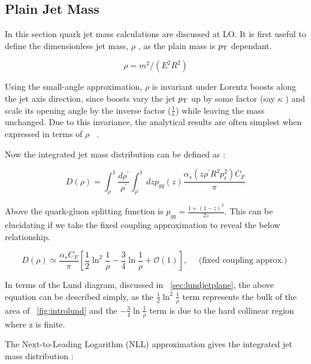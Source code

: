 \subsection{Plain Jet Mass }\label{sec:jetmass}


In this section quark jet mass calculations are discussed at LO. It is first useful to define the dimensionless jet mass, $\rho$ , as the plain mass is $p_{\mathrm{T}}$ dependant.


\begin{equation}
\rho=m^{2} /\left(E^{2} R^{2}\right)
\end{equation}



Using the small-angle approximation, $\rho$ is invariant under Lorentz boosts along the jet axis direction, since boosts vary the jet $p_{\mathrm{T}}$ up by some factor (say $\kappa$ ) and scale its opening angle by the inverse factor ($\frac{1}{\kappa}$) while leaving the mass unchanged. Due to this invariance, the analytical results are often simplest when expressed in terms of $\rho$ ~\cite{mmdt}.

Now the integrated jet mass distribution can be defined as :\newline

\begin{equation}
D(\rho)=\int_{\rho}^{1} \frac{d \rho^{\prime}}{\rho^{\prime}} \int_{\rho^{\prime}}^{1} d z p_{g q}(z) \frac{\alpha_{s}\left(z \rho^{\prime} R^{2} p_{t}^{2}\right) C_{F}}{\pi}
\end{equation}


Above the quark-gluon splitting function is $p_{g q}=\frac{1+(1-z)^{2}}{2 z}$. This can be elucidating if we take the fixed coupling approximation to reveal the below relationship.~\cite{mmdt}


\begin{equation}
D(\rho) \simeq \frac{\alpha_{s} C_{F}}{\pi}\left[\frac{1}{2} \ln ^{2} \frac{1}{\rho}-\frac{3}{4} \ln \frac{1}{\rho}+\mathcal{O}(1)\right], \quad \text { (fixed coupling approx.) }
\end{equation}

In terms of the Lund diagram, discussed in ~\ref{sec:lundjetplane}, the above equation can be described simply, as the $\frac{1}{2} \ln ^{2} \frac{1}{\rho}$ term represents the bulk of the area of ~\ref{fig:introlund} and the $-\frac{3}{4} \ln \frac{1}{\rho}$ term is due to the hard collinear region where z is finite.


The Next-to-Leading Logarithm (NLL) approximation gives the integrated jet mass distribution :\newline


